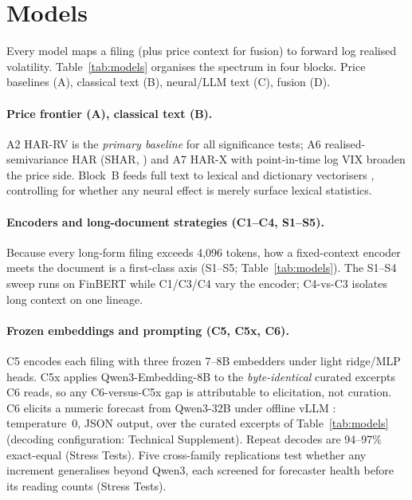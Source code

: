 \section{Models}
\label{sec:methods}

Every model maps a filing (plus price context for fusion) to forward log realised volatility. Table~\ref{tab:models} organises the spectrum in four blocks. Price baselines (A), classical text (B), neural/LLM text (C), fusion (D).

\paragraph{Price frontier (A), classical text (B).}
A2 HAR-RV \citep{corsi2009har} is the \emph{primary baseline} for all significance tests; A6 realised-semivariance HAR (SHAR, \citealp{pattonsheppard2015shar}) and A7 HAR-X with point-in-time log VIX \citep{blair2001forecasting} broaden the price side. Block~B feeds full text to lexical and dictionary vectorisers \citep{kogan2009predicting,loughran2011liability}, controlling for whether any neural effect is merely surface lexical statistics.

\paragraph{Encoders and long-document strategies (C1--C4, S1--S5).}
Because every long-form filing exceeds 4{,}096 tokens, how a fixed-context encoder meets the document is a first-class axis (S1--S5; Table~\ref{tab:models}). The S1--S4 sweep runs on FinBERT \citep{araci2019finbert} while C1/C3/C4 vary the encoder; C4-vs-C3 isolates long context on one lineage.

\paragraph{Frozen embeddings and prompting (C5, C5x, C6).}
C5 encodes each filing with three frozen 7--8B embedders under light ridge/MLP heads. C5x applies Qwen3-Embedding-8B to the \emph{byte-identical} curated excerpts C6 reads, so any C6-versus-C5x gap is attributable to elicitation, not curation. C6 elicits a numeric forecast from Qwen3-32B \citep{qwen3_2025} under offline vLLM \citep{kwon2023vllm}: temperature~0, JSON output, over the curated excerpts of Table~\ref{tab:models} (decoding configuration: Technical Supplement). Repeat decodes are 94--97\% exact-equal (Stress Tests). Five cross-family replications test whether any increment generalises beyond Qwen3, each screened for forecaster health before its reading counts (Stress Tests).

